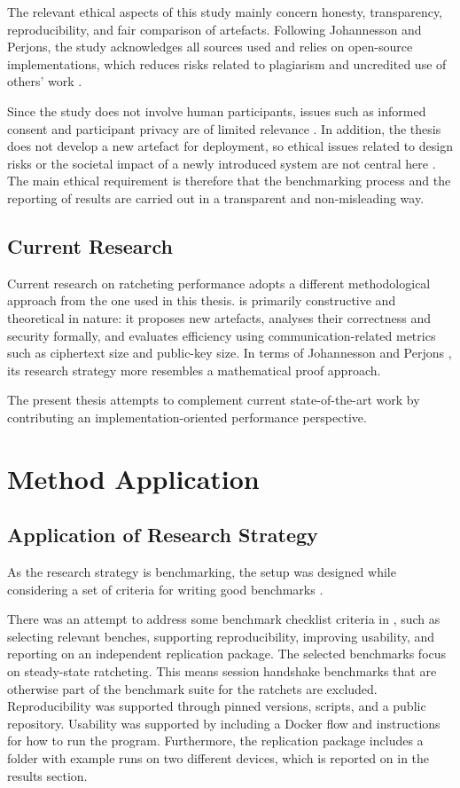 The relevant ethical aspects of this study mainly concern honesty, transparency, reproducibility, and fair comparison of artefacts. Following Johannesson and Perjons, the study acknowledges all sources used and relies on open-source implementations, which reduces risks related to plagiarism and uncredited use of others' work \cite{ref21}.

Since the study does not involve human participants, issues such as informed consent and participant privacy are of limited relevance \cite{ref21}. In addition, the thesis does not develop a new artefact for deployment, so ethical issues related to design risks or the societal impact of a newly introduced system are not central here \cite{ref21}. The main ethical requirement is therefore that the benchmarking process and the reporting of results are carried out in a transparent and non-misleading way.

\subsection{Current Research}

Current research on ratcheting performance adopts a different methodological approach from the one used in this thesis. \cite{ref16} is primarily constructive and theoretical in nature: it proposes new artefacts, analyses their correctness and security formally, and evaluates efficiency using communication-related metrics such as ciphertext size and public-key size. In terms of Johannesson and Perjons \cite{ref21}, its research strategy more resembles a mathematical proof approach.

The present thesis attempts to complement current state-of-the-art work by contributing an implementation-oriented performance perspective.

\section{Method Application}

\subsection{Application of Research Strategy}

As the research strategy is benchmarking, the setup was designed while considering a set of criteria for writing good benchmarks \cite{ref22}.

There was an attempt to address some benchmark checklist criteria in \cite{ref22}, such as selecting relevant benches, supporting reproducibility, improving usability, and reporting on an independent replication package. The selected benchmarks focus on steady-state ratcheting. This means session handshake benchmarks that are otherwise part of the benchmark suite for the ratchets are excluded. Reproducibility was supported through pinned versions, scripts, and a public repository. Usability was supported by including a Docker flow and instructions for how to run the program. Furthermore, the replication package includes a folder with example runs on two different devices, which is reported on in the results section.

